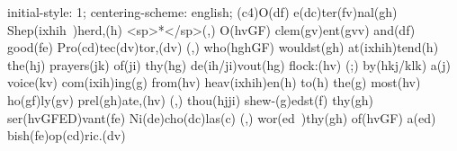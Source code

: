 initial-style: 1;
centering-scheme: english;
(c4)O(df) e(dc)ter(fv)nal(gh) Shep(ixhih~)herd,(h) <sp>*</sp>(,) O(hvGF) clem(gv)ent(gvv) and(df) good(fe) Pro(cd)tec(dv)tor,(dv) (,) who(hghGF) wouldst(gh) at(ixhih)tend(h) the(hj) prayers(jk) of(ji) thy(hg) de(ih/ji)vout(hg) flock:(hv) (;) by(hkj/klk) a(j) voice(kv) com(ixih)ing(g) from(hv) heav(ixhih)en(h) to(h) the(g) most(hv) ho(gf)ly(gv) prel(gh)ate,(hv) (,) thou(hjji) shew-(g)edst(f) thy(gh) ser(hvGFED)vant(fe) Ni(de)cho(dc)las(c) (,) wor(ed~)thy(gh) of(hvGF) a(ed) bish(fe)op(cd)ric.(dv)
